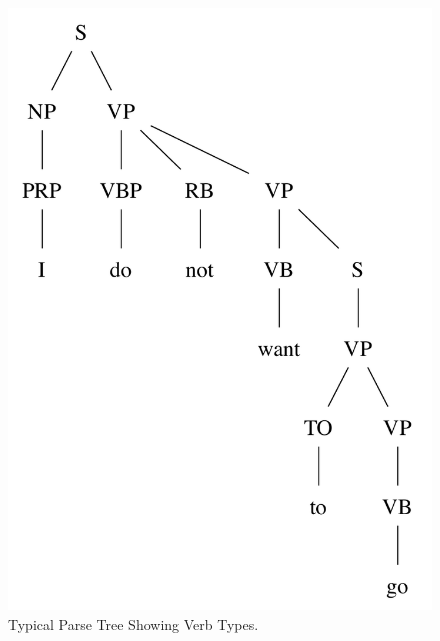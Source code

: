\documentclass[main.tex]{subfiles}
\begin{document}
\begin{figure}[htbp]
\centering
\includegraphics[scale=0.6]{verb-parse.pdf}
\caption{Typical Parse Tree Showing Verb Types.}
\label{fig:verb-parse}
\end{figure}
\end{document}
